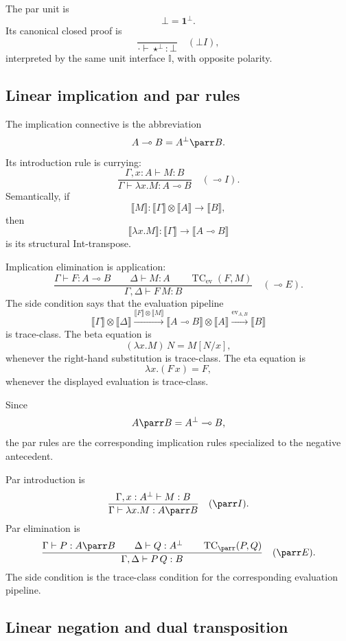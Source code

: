 The par unit is
\[
\bot=\mathbf 1^\bot.
\]
Its canonical closed proof is
\[
\frac{}{\cdot\vdash \star^\bot:\bot}
\quad(\bot I),
\]
interpreted by the same unit interface \(\mathbb I\), with opposite polarity.

\subsection{Linear implication and par rules}

The implication connective is the abbreviation
\[
A\multimap B=A^\bot\parr B.
\]
Its introduction rule is currying:
\[
\frac{
  \Gamma,x:A\vdash M:B
}{
  \Gamma\vdash \lambda x.M:A\multimap B
}
\quad(\multimap I).
\]
Semantically, if
\[
\llbracket M\rrbracket:
\llbracket\Gamma\rrbracket\otimes\llbracket A\rrbracket
\to
\llbracket B\rrbracket,
\]
then
\[
\llbracket \lambda x.M\rrbracket:
\llbracket\Gamma\rrbracket
\to
\llbracket A\multimap B\rrbracket
\]
is its structural Int-transpose.

Implication elimination is application:
\[
\frac{
  \Gamma\vdash F:A\multimap B
  \qquad
  \Delta\vdash M:A
  \qquad
  \operatorname{TC}_{\operatorname{ev}}(F,M)
}{
  \Gamma,\Delta\vdash F\,M:B
}
\quad(\multimap E).
\]
The side condition says that the evaluation pipeline
\[
\llbracket \Gamma\rrbracket\otimes\llbracket\Delta\rrbracket
\xrightarrow{\llbracket F\rrbracket\otimes\llbracket M\rrbracket}
\llbracket A\multimap B\rrbracket\otimes\llbracket A\rrbracket
\xrightarrow{\operatorname{ev}_{A,B}}
\llbracket B\rrbracket
\]
is trace-class.  The beta equation is
\[
(\lambda x.M)\,N=M[N/x],
\]
whenever the right-hand substitution is trace-class.  The eta equation is
\[
\lambda x.(F\,x)=F,
\]
whenever the displayed evaluation is trace-class.

Since
\[
A\parr B=A^\bot\multimap B,
\]
the par rules are the corresponding implication rules specialized to the
negative antecedent.

Par introduction is
\[
\frac{
  \Gamma,x:A^\bot\vdash M:B
}{
  \Gamma\vdash \lambda x.M:A\parr B
}
\quad(\parr I).
\]
Par elimination is
\[
\frac{
  \Gamma\vdash P:A\parr B
  \qquad
  \Delta\vdash Q:A^\bot
  \qquad
  \operatorname{TC}_{\parr}(P,Q)
}{
  \Gamma,\Delta\vdash P\,Q:B
}
\quad(\parr E).
\]
The side condition is the trace-class condition for the corresponding
evaluation pipeline.

\subsection{Linear negation and dual transposition}

